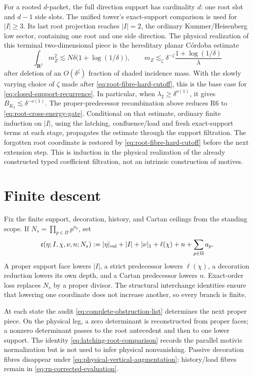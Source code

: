 \documentclass[11pt]{article}
\newcommand{\R}{\mathbf R}
\begin{document}
For a rooted \(d\)-packet, the full direction support has cardinality \(d\):
one root slot and \(d-1\) side slots.  The unified tower's exact-support comparison is
used for \(|I|\ge3\).  Its last root projection reaches \(|I|=2\), the ordinary
Kummer/Heisenberg low sector, containing one root and one side direction.  The
physical realization of this terminal two-dimensional piece is the hereditary
planar C\'ordoba estimate \cite{Cordoba77}
\[
 \int_{\R^2}m_Z^2\lesssim N\delta\bigl(1+\log(1/\delta)\bigr),
 \qquad
 m_Z\lesssim_\zeta
 \delta^{-\zeta}\frac{1+\log(1/\delta)}{\lambda}
\]
after deletion of an \(O(\delta^\zeta)\) fraction of shaded incidence mass.
With the slowly varying choice of \(\zeta\) made after
\eqref{eq:root-fibre-hard-cutoff}, this is the base case for
\eqref{eq:closed-support-recurrence}.  In particular, when
\(\lambda_2\ge\delta^{o(1)}\), it gives
\(B_{K_2}\lesssim\delta^{-o(1)}\).
The proper-predecessor recombination above reduces R6 to
\eqref{eq:root-cross-energy-gate}.  Conditional on that estimate, ordinary
finite induction on \(|I|\), using the latching, confluence/load and fresh
exact-support terms at each stage, propagates the estimate through the support
filtration.  The forgotten root coordinate is restored by
\eqref{eq:root-fibre-hard-cutoff} before the next extension step.  This is
induction in the physical realization of the already constructed typed
coefficient filtration, not an intrinsic construction of motives.

\section{Finite descent}

Fix the finite support, decoration, history, and Cartan ceilings from the
standing scope.  If
\(N_s=\prod_{p\in\Pi}p^{a_p}\), set
\begin{equation}\label{eq:descent-complexity}
 \mathfrak c(\eta;I,\chi,\nu,n;N_s)
 :=
 |\eta|_{\rm val}+|I|+|\nu|_1+\ell(\chi)+n+\sum_{p\in\Pi}a_p.
\end{equation}
A proper support face lowers \(|I|\), a strict predecessor lowers
\(\ell(\chi)\), a decoration reduction lowers its own depth, and a Cartan
predecessor lowers \(n\).  Exact-order loss replaces \(N_s\) by a proper
divisor.  The structural interchange identities ensure that lowering one
coordinate does not increase another, so every branch is finite.

At each state the audit \eqref{eq:complete-obstruction-list} determines the
next proper piece.  On the physical leg, a zero determinant is reconstructed
from proper faces; a nonzero determinant passes to the root antecedent and
then to one lower support.  The identity
\eqref{eq:latching-root-comparison} records the parallel motivic
normalization but is not used to infer physical nonvanishing.  Passive
decoration fibres disappear under \eqref{eq:physical-vertical-augmentation};
history/load fibres remain in \eqref{eq:rn-corrected-evaluation}.
\end{document}
